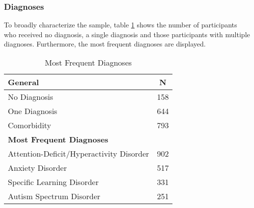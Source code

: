 \subsubsection{Diagnoses}
To broadly characterize the sample, table \ref{tab:diag} shows the number of participants who received no diagnosis, a single diagnosis and those participants with multiple diagnoses. Furthermore, the most frequent diagnoses are displayed. 
\begin{table}[H]
\centering
\begin{tabular}{lc}
\hline
\textbf{General}                  & \textbf{N}       \\ \hline
No Diagnosis                      & 158              \\
One Diagnosis                     & 644              \\
Comorbidity                       & 793              \\ \hline
\multicolumn{2}{l}{\textbf{Most Frequent Diagnoses}} \\ \hline
Attention-Deficit/Hyperactivity Disorder                              & 902              \\
Anxiety Disorder                  & 517              \\
Specific Learning Disorder        & 331              \\
Autism Spectrum Disorder          & 251              \\ \hline
\end{tabular}
\caption{Most Frequent Diagnoses}
    \label{tab:diag}
\end{table}

